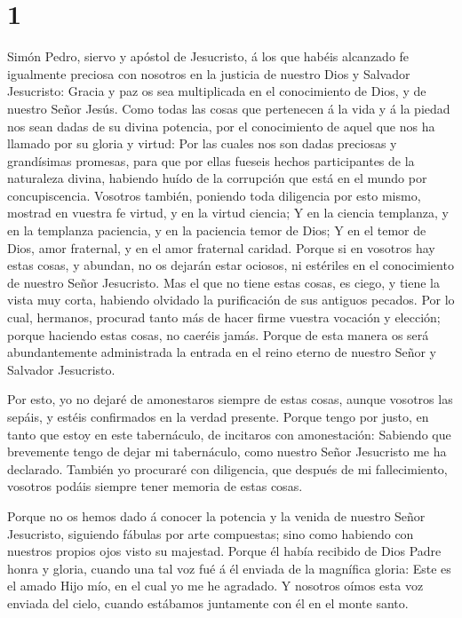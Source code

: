 \hypertarget{section}{%
\section{1}\label{section}}

 Simón Pedro, siervo y apóstol de Jesucristo, á los que
habéis alcanzado fe igualmente preciosa con nosotros en la justicia de
nuestro Dios y Salvador Jesucristo:  Gracia y paz os sea
multiplicada en el conocimiento de Dios, y de nuestro Señor Jesús.
 Como todas las cosas que pertenecen á la vida y á la piedad
nos sean dadas de su divina potencia, por el conocimiento de aquel que
nos ha llamado por su gloria y virtud:  Por las cuales nos
son dadas preciosas y grandísimas promesas, para que por ellas fueseis
hechos participantes de la naturaleza divina, habiendo huído de la
corrupción que está en el mundo por concupiscencia. 
Vosotros también, poniendo toda diligencia por esto mismo, mostrad en
vuestra fe virtud, y en la virtud ciencia;  Y en la ciencia
templanza, y en la templanza paciencia, y en la paciencia temor de Dios;
 Y en el temor de Dios, amor fraternal, y en el amor
fraternal caridad.  Porque si en vosotros hay estas cosas, y
abundan, no os dejarán estar ociosos, ni estériles en el conocimiento de
nuestro Señor Jesucristo.  Mas el que no tiene estas cosas,
es ciego, y tiene la vista muy corta, habiendo olvidado la purificación
de sus antiguos pecados.  Por lo cual, hermanos, procurad
tanto más de hacer firme vuestra vocación y elección; porque haciendo
estas cosas, no caeréis jamás.  Porque de esta manera os
será abundantemente administrada la entrada en el reino eterno de
nuestro Señor y Salvador Jesucristo.

 Por esto, yo no dejaré de amonestaros siempre de estas
cosas, aunque vosotros las sepáis, y estéis confirmados en la verdad
presente.  Porque tengo por justo, en tanto que estoy en
este tabernáculo, de incitaros con amonestación:  Sabiendo
que brevemente tengo de dejar mi tabernáculo, como nuestro Señor
Jesucristo me ha declarado.  También yo procuraré con
diligencia, que después de mi fallecimiento, vosotros podáis siempre
tener memoria de estas cosas.

 Porque no os hemos dado á conocer la potencia y la venida
de nuestro Señor Jesucristo, siguiendo fábulas por arte compuestas; sino
como habiendo con nuestros propios ojos visto su majestad. 
Porque él había recibido de Dios Padre honra y gloria, cuando una tal
voz fué á él enviada de la magnífica gloria: Este es el amado Hijo mío,
en el cual yo me he agradado.  Y nosotros oímos esta voz
enviada del cielo, cuando estábamos juntamente con él en el monte santo.

